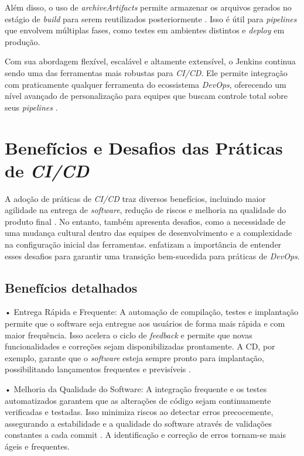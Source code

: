 Além disso, o uso de \textit{archiveArtifacts} permite armazenar os arquivos gerados no estágio de \textit{build} para serem reutilizados posteriormente \cite{JenkinsCore}. Isso é útil para \textit{pipelines} que envolvem múltiplas fases, como testes em ambientes distintos e \textit{deploy} em produção.

Com sua abordagem flexível, escalável e altamente extensível, o Jenkins continua sendo uma das ferramentas mais robustas para \textit{CI/CD}. Ele permite integração com praticamente qualquer ferramenta do ecossistema \textit{DevOps}, oferecendo um nível avançado de personalização para equipes que buscam controle total sobre seus \textit{pipelines} \cite{JenkinsDocumentation}.

\section{Benefícios e Desafios das Práticas de \textit{CI/CD}}

A adoção de práticas de \textit{CI/CD} traz diversos benefícios, incluindo maior agilidade na entrega de \textit{software}, redução de riscos e melhoria na qualidade do produto final \cite{Shahin2017}. No entanto, também apresenta desafios, como a necessidade de uma mudança cultural dentro das equipes de desenvolvimento e a complexidade na configuração inicial das ferramentas. \cite{RiunguKalliosaari2016} enfatizam a importância de entender esses desafios para garantir uma transição bem-sucedida para práticas de \textit{DevOps}.

\subsection{Benefícios detalhados}

• Entrega Rápida e Frequente: A automação de compilação, testes e implantação permite que o software seja entregue aos usuários de forma mais rápida e com maior frequência. Isso acelera o ciclo de \textit{feedback} e permite que novas funcionalidades e correções sejam disponibilizadas prontamente. A CD, por exemplo, garante que o \textit{software} esteja sempre pronto para implantação, possibilitando lançamentos frequentes e previsíveis \cite{AWSCD2024}. 

• Melhoria da Qualidade do Software: A integração frequente e os testes automatizados garantem que as alterações de código sejam continuamente verificadas e testadas. Isso minimiza riscos ao detectar erros precocemente, assegurando a estabilidade e a qualidade do software através de validações constantes a cada commit \cite{AWSCI2024}. A identificação e correção de erros tornam-se mais ágeis e frequentes.

